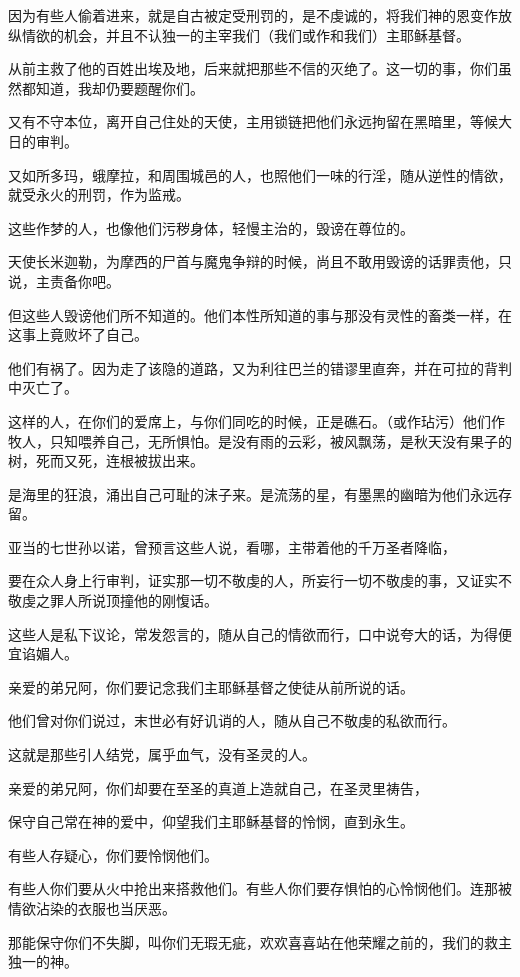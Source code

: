 \documentclass[12pt,oneside]{book}
\begin{document}
因为有些人偷着进来，就是自古被定受刑罚的，是不虔诚的，将我们神的恩变作放纵情欲的机会，并且不认独一的主宰我们（我们或作和我们）主耶稣基督。

从前主救了他的百姓出埃及地，后来就把那些不信的灭绝了。这一切的事，你们虽然都知道，我却仍要题醒你们。

又有不守本位，离开自己住处的天使，主用锁链把他们永远拘留在黑暗里，等候大日的审判。

又如所多玛，蛾摩拉，和周围城邑的人，也照他们一味的行淫，随从逆性的情欲，就受永火的刑罚，作为监戒。

这些作梦的人，也像他们污秽身体，轻慢主治的，毁谤在尊位的。

天使长米迦勒，为摩西的尸首与魔鬼争辩的时候，尚且不敢用毁谤的话罪责他，只说，主责备你吧。

但这些人毁谤他们所不知道的。他们本性所知道的事与那没有灵性的畜类一样，在这事上竟败坏了自己。

他们有祸了。因为走了该隐的道路，又为利往巴兰的错谬里直奔，并在可拉的背判中灭亡了。

这样的人，在你们的爱席上，与你们同吃的时候，正是礁石。（或作玷污）他们作牧人，只知喂养自己，无所惧怕。是没有雨的云彩，被风飘荡，是秋天没有果子的树，死而又死，连根被拔出来。

是海里的狂浪，涌出自己可耻的沫子来。是流荡的星，有墨黑的幽暗为他们永远存留。

亚当的七世孙以诺，曾预言这些人说，看哪，主带着他的千万圣者降临，

要在众人身上行审判，证实那一切不敬虔的人，所妄行一切不敬虔的事，又证实不敬虔之罪人所说顶撞他的刚愎话。

这些人是私下议论，常发怨言的，随从自己的情欲而行，口中说夸大的话，为得便宜谄媚人。

亲爱的弟兄阿，你们要记念我们主耶稣基督之使徒从前所说的话。

他们曾对你们说过，末世必有好讥诮的人，随从自己不敬虔的私欲而行。

这就是那些引人结党，属乎血气，没有圣灵的人。

亲爱的弟兄阿，你们却要在至圣的真道上造就自己，在圣灵里祷告，

保守自己常在神的爱中，仰望我们主耶稣基督的怜悯，直到永生。

有些人存疑心，你们要怜悯他们。

有些人你们要从火中抢出来搭救他们。有些人你们要存惧怕的心怜悯他们。连那被情欲沾染的衣服也当厌恶。

那能保守你们不失脚，叫你们无瑕无疵，欢欢喜喜站在他荣耀之前的，我们的救主独一的神。
\end{document}
